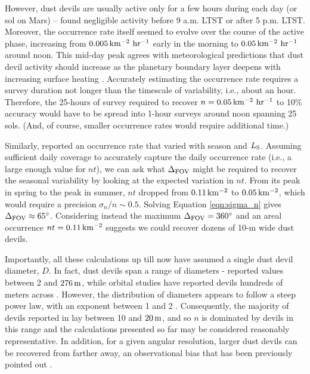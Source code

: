 \documentclass{aastex63}
\begin{document}
However, dust devils are usually active only for a few hours during each day (or sol on Mars) -- \citet{2006JGRE..11112S09G} found negligible activity before 9 a.m. LTST or after 5 p.m. LTST. Moreover, the occurrence rate itself seemed to evolve over the course of the active phase, increasing from $0.005\,{\rm km^{-2}\ hr^{-1}}$ early in the morning to  $0.05\,{\rm km^{-2}\ hr^{-1}}$ around noon. This mid-day peak agrees with meteorological predictions that dust devil activity should increase as the planetary boundary layer deepens with increasing surface heating \citep{doi:10.1029/2010RG000351}. Accurately estimating the occurrence rate requires a survey duration not longer than the timescale of variability, i.e., about an hour. Therefore, the 25-hours of survey required to recover $n = 0.05\,{\rm km^{-2}\ hr^{-1}}$ to 10\% accuracy would have to be spread into 1-hour surveys around noon spanning 25 sols. (And, of course, smaller occurrence rates would require additional time.) 

Similarly, \citet{2006JGRE..11112S09G} reported an occurrence rate that varied with season and $L_{\rm S}$. Assuming sufficient daily coverage to accurately capture the daily occurrence rate (i.e., a large enough value for $n t$), we can ask what $\Delta_{\rm FOV}$ might be required to recover the seasonal variability by looking at the expected variation in $n t$. From its peak in spring to the peak in summer, $n t$ dropped from $0.11\,{\rm km^{-2}}$ to $0.05\,{\rm km^{-2}}$, which would require a precision $\sigma_n/n \sim 0.5$. Solving Equation \ref{eqn:sigma_n} gives $\Delta_{\rm FOV} \approx 65^\circ$. Considering instead the maximum $\Delta_{\rm FOV} = 360^\circ$ and an areal occurrence $nt = 0.11\,{\rm km^{-2}}$ suggests we could recover dozens of 10-m wide dust devils. 

Importantly, all these calculations up till now have assumed a single dust devil diameter, $D$. In fact, dust devils span a range of diameters - \citet{2006JGRE..11112S09G} reported values between 2 and $276\,{\rm m}$, while orbital studies have reported devils hundreds of meters across \citep{2008Icar..197...39S}. However, the distribution of diameters appears to follow a steep power law, with an exponent between 1 and 2 \citep{2016SSRv..203..277L}. Consequently, the majority of devils reported in \citet{2006JGRE..11112S09G} lay between 10 and $20\,{\rm m}$, and so $n$ is dominated by devils in this range and the calculations presented so far may be considered reasonably representative. In addition, for a given angular resolution, larger dust devils can be recovered from farther away, an observational bias that has been previously pointed out \citep{2012Icar..219..556K, 2013Icar..226..964L}.
\end{document}
